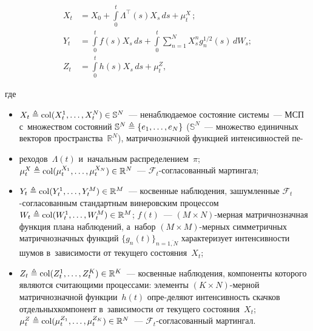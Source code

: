 \begin{multicols}{2}
  \noindent
\begin{align}
 X_t &=X_0 + \int\limits_0^t \Lambda^{\top}(s)X_{s}\,ds + \mu_t^X\,;
 \label{eq:stat_1}
 \\[-2pt]
 Y_t &= \int\limits_{0}^{t}f(s)X_s\,ds+\int\limits_{0}^{t} \sum\limits_{n=1}^NX_s^ng_n^{1/2}(s)\,dW_s;
 \label{eq:cobs_1}
 \\[2pt]
 \displaystyle Z_t& = \int\limits_{0}^{t}h(s)X_s\,ds+\mu_t^Z,
 \label{eq:sobs_1}
 \end{align}
 
   \vspace*{-6pt}
   
   \noindent
 где
 
   \vspace*{-2pt}
   
   \noindent
  \begin{itemize}
  \item
  $X_t \triangleq \mathop{\mathrm{col}}(X_t^1,\ldots,X_t^N) \hm\in \mathbb{S}^N$~--- 
  ненаблюдаемое состояние системы~--- МСП с~множеством состояний $\mathbb{S}^N \hm\triangleq 
  \{e_1,\ldots,e_N\}$ ($\mathbb{S}^N$~--- множество единичных векторов пространства~$\mathbb{R}^N$), 
  мат\-рич\-но\-знач\-ной функцией интенсивностей пе-\linebreak\vspace*{-16pt}
  \end{itemize}
  
  \pagebreak
  
\begin{itemize}
  \item[\ ]
  реходов~$\Lambda(t)$ и~начальным распределением~$\pi$;
  $\mu_t^X \hm \triangleq \mathop{\mathrm{col}}(\mu_t^{X_1},\ldots,\mu_t^{X_N})\hm\in \mathbb{R}^N$~--- 
  $\mathcal{F}_t$-со\-гла\-со\-ван\-ный мартингал;
  \item
  $Y_t \triangleq \mathop{\mathrm{col}}(Y_t^1,\ldots,Y_t^M) \hm\in \mathbb{R}^M$~--- косвенные наблюдения,
зашумленные $\mathcal{F}_t$-со\-гла\-со\-ван\-ным стандартным винеровским процессом $W_t 
\hm\triangleq \mathop{\mathrm{col}}(W_t^1,\ldots,W_t^M) \hm\in \mathbb{R}^M$;  
$f(t)$~--- $(M \times N)$-мер\-ная матричнозначная функция плана наблюдений, а~набор $(M\times M)$-мер\-ных 
симметричных матричнозначных функций
  $\{g_n(t)\}_{n=\overline{1,N}}$ характеризует интенсивности шумов 
  в~зависимости от текущего состояния~$X_t$;
  \item
  $Z_t \triangleq \mathop{\mathrm{col}}(Z_t^1,\ldots,Z_t^K) \hm\in \mathbb{R}^K$~--- 
  косвенные наблюдения, компоненты которого являются считающими процессами: 
  элементы \mbox{$(K \times N)$}-мер\-ной матричнозначной функции~$h(t)$ опре-\linebreak деляют интенсивность скачков 
  отдельных\linebreak компонент в~за\-ви\-си\-мости от текущего со\-сто\-яния~$X_t$; 
  $\mu_t^Z \hm\triangleq \mathop{\mathrm{col}}(\mu_t^{Z_1},\ldots,\mu_t^{Z_K})
  \hm\in \mathbb{R}^N$~--- $\mathcal{F}_t$-со\-гла\-со\-ван\-ный мартингал.
  \end{itemize}


\end{multicols}
